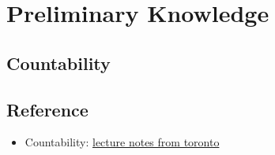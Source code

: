 \chapter{Preliminary Knowledge}\label{chp:0_1}

\section{Countability}




\section{Reference}
\begin{itemize}
    \item Countability: \href{https://www.math.toronto.edu/ivan/mat327/docs/notes/04-countability.pdf}{lecture notes from toronto}
\end{itemize}